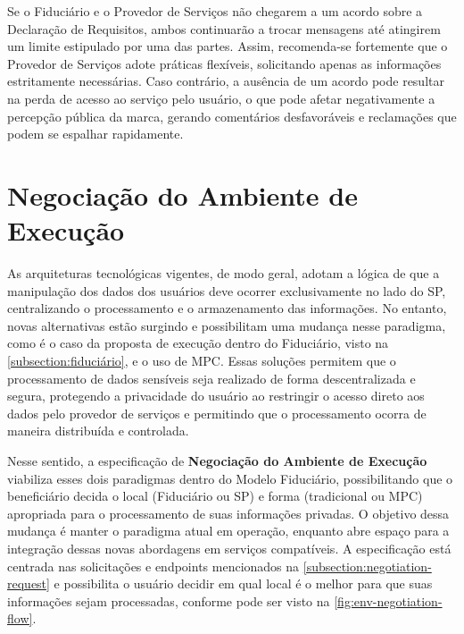 Se o Fiduciário e o Provedor de Serviços não chegarem a um acordo sobre a Declaração de Requisitos, ambos continuarão a trocar mensagens até atingirem um limite estipulado por uma das partes. Assim, recomenda-se fortemente que o Provedor de Serviços adote práticas flexíveis, solicitando apenas as informações estritamente necessárias. Caso contrário, a ausência de um acordo pode resultar na perda de acesso ao serviço pelo usuário, o que pode afetar negativamente a percepção pública da marca, gerando comentários desfavoráveis e reclamações que podem se espalhar rapidamente.

% 


\clearpage
\section{Negociação do Ambiente de Execução}\label{section:env-negotiation}

As arquiteturas tecnológicas vigentes, de modo geral, adotam a lógica de que a manipulação dos dados dos usuários deve ocorrer exclusivamente no lado do \acs{SP}, centralizando o processamento e o armazenamento das informações. No entanto, novas alternativas estão surgindo e possibilitam uma mudança nesse paradigma, como é o caso da proposta de execução dentro do Fiduciário, visto na \autoref{subsection:fiduciário}, e o uso de \acs{MPC}. Essas soluções permitem que o processamento de dados sensíveis seja realizado de forma descentralizada e segura, protegendo a privacidade do usuário ao restringir o acesso direto aos dados pelo provedor de serviços e permitindo que o processamento ocorra de maneira distribuída e controlada. 

Nesse sentido, a especificação de \textbf{Negociação do Ambiente de Execução} viabiliza esses dois paradigmas dentro do Modelo Fiduciário, possibilitando que o beneficiário decida o local (Fiduciário ou \acs{SP}) e forma (tradicional ou \acs{MPC}) apropriada para o processamento de suas informações privadas. O objetivo dessa mudança é manter o paradigma atual em operação, enquanto abre espaço para a integração dessas novas abordagens em serviços compatíveis. A especificação está centrada nas solicitações e endpoints mencionados na \autoref{subsection:negotiation-request} e possibilita o usuário decidir em qual local é o melhor para que suas informações sejam processadas, conforme pode ser visto na \autoref{fig:env-negotiation-flow}.



